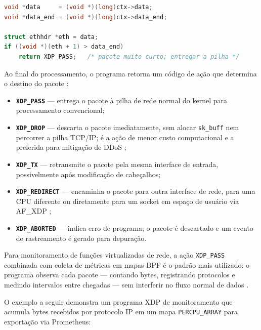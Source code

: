 \begin{lstlisting}[language=C,
  caption={Acesso seguro ao cabeçalho Ethernet em um programa XDP.}]
void *data     = (void *)(long)ctx->data;
void *data_end = (void *)(long)ctx->data_end;

struct ethhdr *eth = data;
if ((void *)(eth + 1) > data_end)
    return XDP_PASS;   /* pacote muito curto; entregar a pilha */
\end{lstlisting}

Ao final do processamento, o programa retorna um código de ação que determina o
destino do pacote \cite{linuxkernel2024}:

\begin{itemize}
  \item \textbf{\texttt{XDP\_PASS}} --- entrega o pacote à pilha de rede normal
        do kernel para processamento convencional;
  \item \textbf{\texttt{XDP\_DROP}} --- descarta o pacote imediatamente, sem
        alocar \texttt{sk\_buff} nem percorrer a pilha TCP/IP; é a ação de menor
        custo computacional e a preferida para mitigação de DDoS \cite{gregg2019};
  \item \textbf{\texttt{XDP\_TX}} --- retransmite o pacote pela mesma interface
        de entrada, possivelmente após modificação de cabeçalhos;
  \item \textbf{\texttt{XDP\_REDIRECT}} --- encaminha o pacote para outra
        interface de rede, para uma CPU diferente ou diretamente para um socket
        em espaço de usuário via AF\_XDP \cite{linuxkernel2024};
  \item \textbf{\texttt{XDP\_ABORTED}} --- indica erro de programa; o pacote é
        descartado e um evento de rastreamento é gerado para depuração.
\end{itemize}

Para monitoramento de funções virtualizadas de rede, a ação \texttt{XDP\_PASS}
combinada com coleta de métricas em mapas BPF é o padrão mais utilizado:
o programa observa cada pacote --- contando bytes, registrando protocolos e
medindo intervalos entre chegadas --- sem interferir no fluxo normal de dados
\cite{venancio2021}.

O exemplo a seguir demonstra um programa XDP de monitoramento que acumula bytes
recebidos por protocolo IP em um mapa \texttt{PERCPU\_ARRAY} para exportação via
Prometheus:

